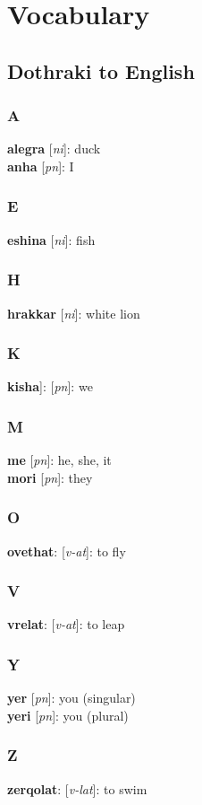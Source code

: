 \chapter{Vocabulary}
\section*{Dothraki to English}
\begin{multicols}{2}
\subsection*{A}
\textbf{alegra} [\textit{ni}]: duck \\
\textbf{anha} [\textit{pn}]: I \\
\subsection*{E}
\textbf{eshina} [\textit{ni}]: fish \\
\subsection*{H}
\textbf{hrakkar} [\textit{ni}]: white lion \\
\subsection*{K}
\textbf{kisha}]: [\textit{pn}]: we \\
\subsection*{M}
\textbf{me} [\textit{pn}]: he, she, it \\
\textbf{mori} [\textit{pn}]: they \\
\subsection*{O}
\textbf{ovethat}: [\textit{v-at}]: to fly \\
\subsection*{V}
\textbf{vrelat}: [\textit{v-at}]: to leap \\
\subsection*{Y}
\textbf{yer} [\textit{pn}]: you (singular) \\
\textbf{yeri} [\textit{pn}]: you (plural) \\
\subsection*{Z}
\textbf{zerqolat}: [\textit{v-lat}]: to swim \\
\end{multicols}
\pagebreak
